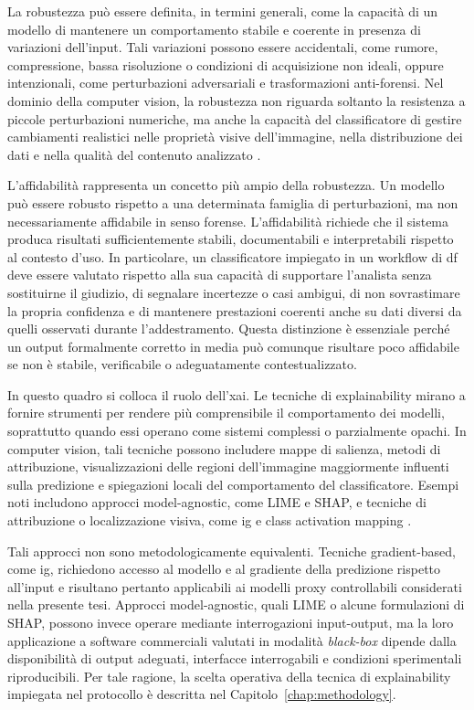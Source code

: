 La robustezza può essere definita, in termini generali, come la capacità di un
modello di mantenere un comportamento stabile e coerente in presenza di
variazioni dell'input. Tali variazioni possono essere accidentali, come rumore,
compressione, bassa risoluzione o condizioni di acquisizione non ideali, oppure
intenzionali, come perturbazioni adversariali e trasformazioni anti-forensi. Nel
dominio della computer vision, la robustezza non riguarda soltanto la resistenza
a piccole perturbazioni numeriche, ma anche la capacità del classificatore di
gestire cambiamenti realistici nelle proprietà visive dell'immagine, nella
distribuzione dei dati e nella qualità del contenuto analizzato
\cite{hendrycks2019benchmarking,ford2019adversarial}.

L'affidabilità rappresenta un concetto più ampio della robustezza. Un modello
può essere robusto rispetto a una determinata famiglia di perturbazioni, ma non
necessariamente affidabile in senso forense. L'affidabilità richiede che il
sistema produca risultati sufficientemente stabili, documentabili e
interpretabili rispetto al contesto d'uso. In particolare, un classificatore
impiegato in un workflow di \gls{df} deve essere valutato rispetto alla sua
capacità di supportare l'analista senza sostituirne il giudizio, di segnalare
incertezze o casi ambigui, di non sovrastimare la propria confidenza e di
mantenere prestazioni coerenti anche su dati diversi da quelli osservati durante
l'addestramento. Questa distinzione è essenziale perché un output formalmente
corretto in media può comunque risultare poco affidabile se non è stabile,
verificabile o adeguatamente contestualizzato.

In questo quadro si colloca il ruolo dell'\gls{xai}. Le tecniche di
explainability mirano a fornire strumenti per rendere più comprensibile il
comportamento dei modelli, soprattutto quando essi operano come sistemi
complessi o parzialmente opachi. In computer vision, tali tecniche possono
includere mappe di salienza, metodi di attribuzione, visualizzazioni delle
regioni dell'immagine maggiormente influenti sulla predizione e spiegazioni
locali del comportamento del classificatore. Esempi noti includono approcci
model-agnostic, come LIME e SHAP, e tecniche di attribuzione o localizzazione
visiva, come \gls{ig} e class activation mapping
\cite{Ribeiro2016,Lundberg2017,Sundararajan2017,Zhou2016}.

Tali approcci non sono metodologicamente equivalenti. Tecniche gradient-based,
come \gls{ig}, richiedono accesso al modello e al gradiente della predizione
rispetto all'input e risultano pertanto applicabili ai modelli proxy
controllabili considerati nella presente tesi. Approcci model-agnostic, quali
LIME o alcune formulazioni di SHAP, possono invece operare mediante
interrogazioni input-output, ma la loro applicazione a software commerciali
valutati in modalità \textit{black-box} dipende dalla disponibilità di output
adeguati, interfacce interrogabili e condizioni sperimentali riproducibili. Per
tale ragione, la scelta operativa della tecnica di explainability impiegata nel
protocollo è descritta nel Capitolo~\ref{chap:methodology}.

